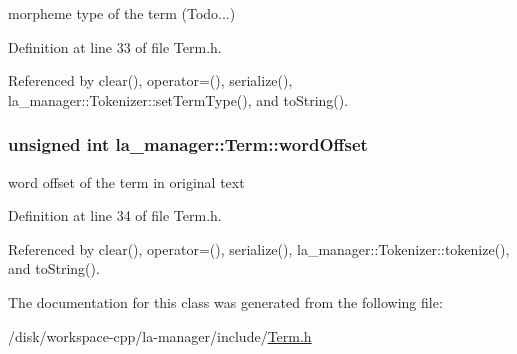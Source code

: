 morpheme type of the term (Todo...) 



Definition at line 33 of file Term.h.

Referenced by clear(), operator=(), serialize(), la\_\-manager::Tokenizer::setTermType(), and toString().\hypertarget{classla__manager_1_1Term_8625d3cd801afc5b6c587e0c38d9e323}{
\subsubsection[{wordOffset}]{\setlength{\rightskip}{0pt plus 5cm}unsigned int {\bf la\_\-manager::Term::wordOffset}}}
\label{classla__manager_1_1Term_8625d3cd801afc5b6c587e0c38d9e323}


word offset of the term in original text 



Definition at line 34 of file Term.h.

Referenced by clear(), operator=(), serialize(), la\_\-manager::Tokenizer::tokenize(), and toString().

The documentation for this class was generated from the following file:\begin{CompactItemize}
\item 
/disk/workspace-cpp/la-manager/include/\hyperlink{Term_8h}{Term.h}\end{CompactItemize}
